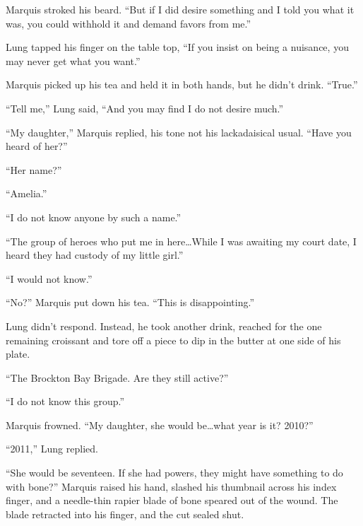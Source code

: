 Marquis stroked his beard.  ``But if I did desire something and I told you what it was, you could withhold it and demand favors from me.''



Lung tapped his finger on the table top, ``If you insist on being a nuisance, you may never get what you want.''



Marquis picked up his tea and held it in both hands, but he didn't drink.  ``True.''



``Tell me,'' Lung said, ``And you may find I do not desire much.''



``My daughter,'' Marquis replied, his tone not his lackadaisical usual.  ``Have you heard of her?''



``Her name?''



``Amelia.''



``I do not know anyone by such a name.''



``The group of heroes who put me in here\ldots While I was awaiting my court date, I heard they had custody of my little girl.''



``I would not know.''



``No?'' Marquis put down his tea.  ``This is disappointing.''



Lung didn't respond.  Instead, he took another drink, reached for the one remaining croissant and tore off a piece to dip in the butter at one side of his plate.



``The Brockton Bay Brigade.  Are they still active?''



``I do not know this group.''



Marquis frowned.  ``My daughter, she would be\ldots what year is it?  2010?''



``2011,'' Lung replied.



``She would be seventeen.  If she had powers, they might have something to do with bone?''  Marquis raised his hand, slashed his thumbnail across his index finger, and a needle-thin rapier blade of bone speared out of the wound.  The blade retracted into his finger, and the cut sealed shut.



